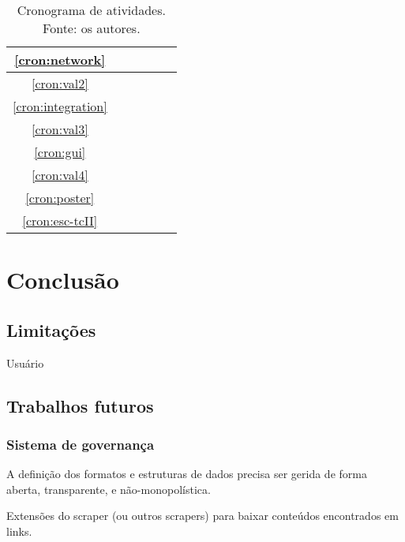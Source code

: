 \begin{table}[!htbp]
\begin{tabular}{|c|c|c|c|c|c|}
        \hline
        \ref{cron:network}      &                           &                     & \cellcolor{midgray} &                     &                     \\
        \hline
        \ref{cron:val2}         &                           &                     & \cellcolor{midgray} &                     &                     \\
        \hline
        \ref{cron:integration}  &                           &                     &                     & \cellcolor{midgray} &                     \\
        \hline
        \ref{cron:val3}         &                           &                     &                     & \cellcolor{midgray} &                     \\
        \hline
        \ref{cron:gui}          &                           &                     &                     & \cellcolor{midgray} &                     \\
        \hline
        \ref{cron:val4}         &                           &                     &                     & \cellcolor{midgray} &                     \\
        \hline
        \ref{cron:poster}       &                           &                     &                     & \cellcolor{midgray} &                     \\
        \hline
        \ref{cron:esc-tcII}     &                           &                     &                     &                     & \cellcolor{midgray} \\
        \hline
    \end{tabular}
    \caption{\label{tab:schedule}
        Cronograma de atividades.\\
        Fonte: os autores.
    }
\end{table}



\chapter{Conclusão}

\section{Limitações}

Usuário 

\section{Trabalhos futuros}

\subsection{Sistema de governança}

A definição dos formatos e estruturas de dados precisa ser gerida de forma aberta, transparente, e não-monopolística.

Extensões do scraper (ou outros scrapers) para baixar conteúdos encontrados em links.
